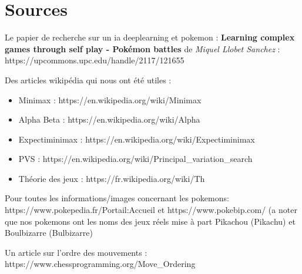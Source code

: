 \section{Sources}
    Le papier de recherche sur un ia deeplearning et pokemon : \textbf{Learning complex games through self play - Pokémon battles} de \emph{Miquel Llobet Sanchez} : https://upcommons.upc.edu/handle/2117/121655
    
    Des articles wikipédia qui nous ont été utiles :
    \begin{itemize}
		\item Minimax : https://en.wikipedia.org/wiki/Minimax
		\item Alpha Beta : https://en.wikipedia.org/wiki/Alpha%
		\item Expectiminimax : https://en.wikipedia.org/wiki/Expectiminimax
		\item PVS : https://en.wikipedia.org/wiki/Principal\_variation\_search
		\item Théorie des jeux : https://fr.wikipedia.org/wiki/Th%
	\end{itemize}
   Pour toutes les informations/images concernant les pokemons: https://www.pokepedia.fr/Portail:Accueil et https://www.pokebip.com/
   (a noter que nos pokemons ont les noms des jeux réels mise à part Pikachou (Pikachu) et Boulbizarre (Bulbizarre)
   
   Un article sur l'ordre des mouvements : https://www.chessprogramming.org/Move\_Ordering
    